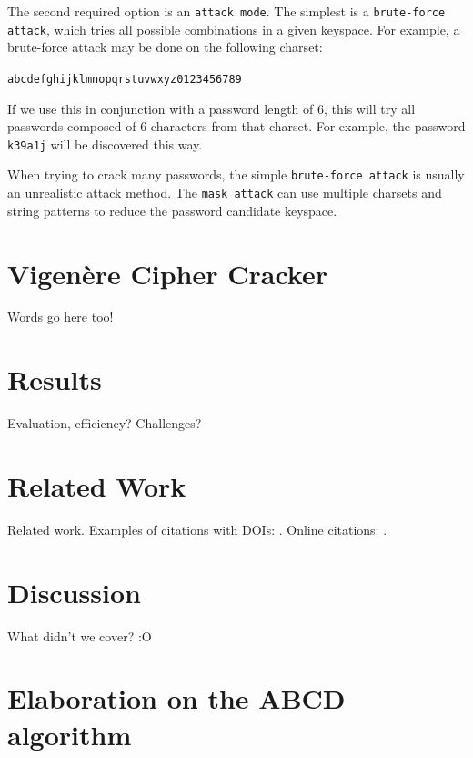 \documentclass[acmlarge]{acmart}
\begin{document}
The second required option is an \texttt{attack mode}. The simplest is a \texttt{brute-force attack}, which tries all possible combinations in a given keyspace. For example, a brute-force attack may be done on the following charset:

\begin{center}
\texttt{abcdefghijklmnopqrstuvwxyz0123456789}	
\end{center}

If we use this in conjunction with a password length of $6$, this will try all passwords composed of $6$ characters from that charset. For example, the password \texttt{k39a1j} will be discovered this way.

When trying to crack many passwords, the simple \texttt{brute-force attack} is usually an unrealistic attack method. The \texttt{mask attack} can use multiple charsets and string patterns to reduce the password candidate keyspace. 

\section{Vigenère Cipher Cracker}\label{sec:vinegar}

Words go here too!

\section{Results}\label{sec:results}

Evaluation, efficiency? Challenges?

\section{Related Work}\label{sec:relatedwork}

Related work. Examples of citations with DOIs: \cite{2004:ITE:1009386.1010128, Kirschmer:2010:AEI:1958016.1958018}. Online citations: \cite{TUGInstmem, Thornburg01, CTANacmart}.

\section{Discussion}\label{sec:discussion}

What didn't we cover? :O

\appendix
\section{Elaboration on the ABCD algorithm}
\end{document}
